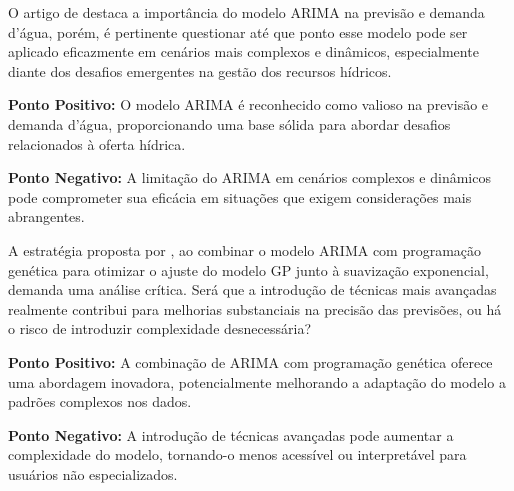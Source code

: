 %
%
%

O artigo de  destaca a importância do modelo ARIMA na previsão e demanda d'água, porém, é pertinente questionar até que ponto esse modelo pode ser aplicado eficazmente em cenários mais complexos e dinâmicos, especialmente diante dos desafios emergentes na gestão dos recursos hídricos.

\textbf{Ponto Positivo:} O modelo ARIMA é reconhecido como valioso na previsão e demanda d'água, proporcionando uma base sólida para abordar desafios relacionados à oferta hídrica.

\textbf{Ponto Negativo:} A limitação do ARIMA em cenários complexos e dinâmicos pode comprometer sua eficácia em situações que exigem considerações mais abrangentes.

A estratégia proposta por , ao combinar o modelo ARIMA com programação genética para otimizar o ajuste do modelo GP junto à suavização exponencial, demanda uma análise crítica. Será que a introdução de técnicas mais avançadas realmente contribui para melhorias substanciais na precisão das previsões, ou há o risco de introduzir complexidade desnecessária?

\textbf{Ponto Positivo:} A combinação de ARIMA com programação genética oferece uma abordagem inovadora, potencialmente melhorando a adaptação do modelo a padrões complexos nos dados.

\textbf{Ponto Negativo:} A introdução de técnicas avançadas pode aumentar a complexidade do modelo, tornando-o menos acessível ou interpretável para usuários não especializados.

